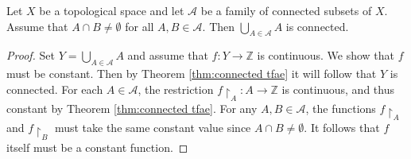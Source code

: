 \documentclass[a4paper,11pt]{article}
\begin{document}
\begin{lemma}\label{lma:union connected}
    Let $X$ be a topological space and let $\mathcal{A}$ be a family of connected subsets of $X$. Assume that $A \cap B \neq \emptyset$ for all $A, B \in \mathcal{A}$. Then $\bigcup_{A \in \mathcal{A}} A$ is connected.
\end{lemma}

\begin{proof}
    Set $Y=\bigcup_{A \in \mathcal{A}} A$ and assume that $f: Y \rightarrow \mathbb{Z}$ is continuous. We show that $f$ must be constant. Then by Theorem \ref{thm:connected tfae} it will follow that $Y$ is connected. For each $A \in \mathcal{A}$, the restriction $f\restriction_{A}: A \rightarrow \mathbb{Z}$ is continuous, and thus constant by Theorem \ref{thm:connected tfae}. For any $A, B \in \mathcal{A}$, the functions $f\restriction_{A}$ and $f\restriction_{B}$ must take the same constant value since $A \cap B \neq \emptyset$. It follows that $f$ itself must be a constant function.
\end{proof}
\end{document}
